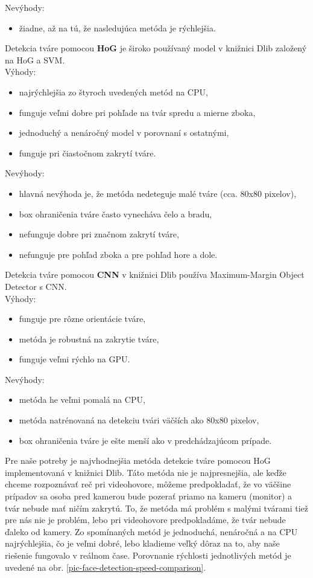 Nevýhody:
\begin{itemize}
	\item žiadne, až na tú, že nasledujúca metóda je rýchlejšia.\\
\end{itemize}
Detekcia tváre pomocou \textbf{HoG} je široko používaný model v knižnici Dlib založený na HoG a SVM.\\
Výhody:
\begin{itemize}
	\item najrýchlejšia zo štyroch uvedených metód na CPU,
	\item funguje veľmi dobre pri pohľade na tvár spredu a mierne zboka,
	\item jednoduchý a nenáročný model v porovnaní s ostatnými,
	\item funguje pri čiastočnom zakrytí tváre.
\end{itemize}
Nevýhody:
\begin{itemize}
	\item hlavná nevýhoda je, že metóda nedeteguje malé tváre (cca. 80x80 pixelov),
	\item box ohraničenia tváre často vynecháva čelo a bradu,
	\item nefunguje dobre pri značnom zakrytí tváre,
	\item nefunguje pre pohľad zboka a pre pohľad hore a dole.\\
\end{itemize}
Detekcia tváre pomocou \textbf{CNN} v knižnici Dlib používa Maximum-Margin Object Detector s CNN.\\
Výhody:
\begin{itemize}
	\item funguje pre rôzne orientácie tváre,
	\item metóda je robustná na zakrytie tváre,
	\item funguje veľmi rýchlo na GPU.
\end{itemize}
Nevýhody:
\begin{itemize}
	\item metóda he veľmi pomalá na CPU,
	\item metóda natrénovaná na detekciu tvári väčších ako 80x80 pixelov,
	\item box ohraničenia tváre je ešte menší ako v predchádzajúcom prípade.\\
\end{itemize}

Pre naše potreby je najvhodnejšia metóda detekcie tváre pomocou HoG implementovaná v knižnici Dlib.
Táto metóda nie je najpresnejšia, ale keďže chceme rozpoznávať reč pri videohovore, môžeme predpokladať, že vo väčšine prípadov sa osoba pred kamerou bude pozerať priamo na kameru (monitor) a tvár  nebude mať ničím zakrytú.
To, že metóda má problém s malými tvárami tiež pre nás nie je problém, lebo pri videohovore predpokladáme, že tvár nebude ďaleko od kamery.
Zo spomínaných metód je jednoduchá, nenáročná a na CPU najrýchlejšia, čo je veľmi dobré, lebo kladieme veľký dôraz na to, aby naše riešenie fungovalo v reálnom čase.
Porovnanie rýchlosti jednotlivých metód je uvedené na obr. \ref{pic-face-detection-speed-comparison}.

